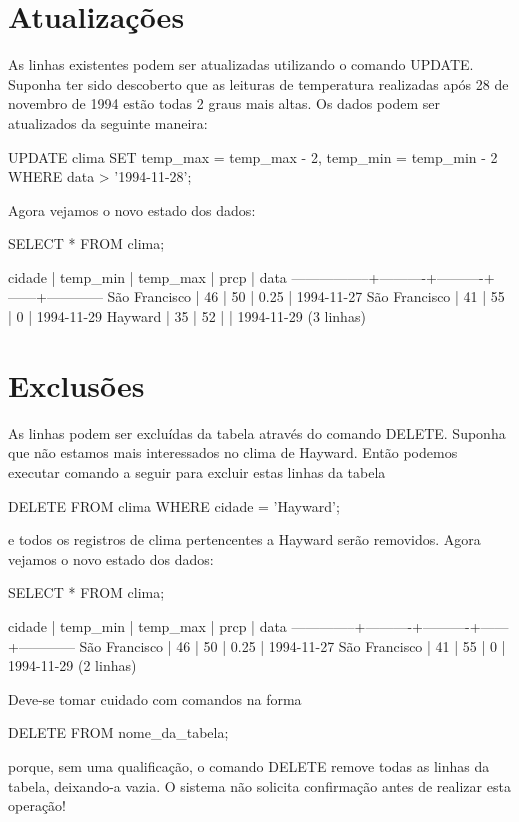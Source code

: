 \section{Atualizações}\setcounter{SteP}{1}
As linhas existentes podem ser atualizadas utilizando o comando UPDATE. Suponha ter sido descoberto que as leituras de temperatura realizadas após 28 de novembro de 1994 estão todas 2 graus mais altas. Os dados podem ser atualizados da seguinte maneira:

\begin{BoxVerbatim}
UPDATE clima
    SET temp_max = temp_max - 2,  temp_min = temp_min - 2
    WHERE data > '1994-11-28';
\end{BoxVerbatim}

Agora vejamos o novo estado dos dados:
\begin{BoxVerbatim}
SELECT * FROM clima;

     cidade      | temp_min | temp_max | prcp |    data
-----------------+----------+----------+------+------------
 São Francisco   |       46 |       50 | 0.25 | 1994-11-27
 São Francisco   |       41 |       55 |    0 | 1994-11-29
 Hayward         |       35 |       52 |      | 1994-11-29
(3 linhas)
\end{BoxVerbatim}

\section{Exclusões}\setcounter{SteP}{1}
As linhas podem ser excluídas da tabela através do comando DELETE. Suponha que não estamos mais interessados no clima de Hayward. Então podemos executar comando a seguir para excluir estas linhas da tabela

\begin{BoxVerbatim}
DELETE FROM clima WHERE cidade = 'Hayward';
\end{BoxVerbatim}

e todos os registros de clima pertencentes a Hayward serão removidos. Agora vejamos o novo estado dos dados:
\begin{BoxVerbatim}
SELECT * FROM clima;

   cidade     | temp_min | temp_max | prcp |    data
--------------+----------+----------+------+------------
São Francisco |       46 |       50 | 0.25 | 1994-11-27
São Francisco |       41 |       55 |    0 | 1994-11-29
(2 linhas)
\end{BoxVerbatim}

Deve-se tomar cuidado com comandos na forma
\begin{BoxVerbatim}
DELETE FROM nome_da_tabela;
\end{BoxVerbatim}

porque, sem uma qualificação, o comando DELETE remove todas as linhas da tabela, deixando-a vazia. O sistema não solicita confirmação antes de realizar esta operação!
